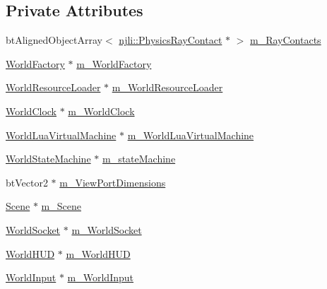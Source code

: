 \subsection*{Private Attributes}
\begin{DoxyCompactItemize}
\item 
bt\+Aligned\+Object\+Array$<$ \mbox{\hyperlink{classnjli_1_1_physics_ray_contact}{njli\+::\+Physics\+Ray\+Contact}} $\ast$ $>$ \mbox{\hyperlink{classnjli_1_1_world_a96897049ea6e799e334d53f8e8735e35}{m\+\_\+\+Ray\+Contacts}}
\item 
\mbox{\hyperlink{classnjli_1_1_world_factory}{World\+Factory}} $\ast$ \mbox{\hyperlink{classnjli_1_1_world_ae50678873f637941aa87ec45c33e9a1c}{m\+\_\+\+World\+Factory}}
\item 
\mbox{\hyperlink{classnjli_1_1_world_resource_loader}{World\+Resource\+Loader}} $\ast$ \mbox{\hyperlink{classnjli_1_1_world_a4ebb658eba80c17e930b96881d3a4e19}{m\+\_\+\+World\+Resource\+Loader}}
\item 
\mbox{\hyperlink{classnjli_1_1_world_clock}{World\+Clock}} $\ast$ \mbox{\hyperlink{classnjli_1_1_world_aacebc8d861e42a409cf1a875972da641}{m\+\_\+\+World\+Clock}}
\item 
\mbox{\hyperlink{classnjli_1_1_world_lua_virtual_machine}{World\+Lua\+Virtual\+Machine}} $\ast$ \mbox{\hyperlink{classnjli_1_1_world_ab3878c3df6c61327dfd7a08864e567a9}{m\+\_\+\+World\+Lua\+Virtual\+Machine}}
\item 
\mbox{\hyperlink{classnjli_1_1_world_state_machine}{World\+State\+Machine}} $\ast$ \mbox{\hyperlink{classnjli_1_1_world_a14412bd1ed14fca506732c0234db2b28}{m\+\_\+state\+Machine}}
\item 
bt\+Vector2 $\ast$ \mbox{\hyperlink{classnjli_1_1_world_a0ac18bfa72f55b16c00703e1035a0af7}{m\+\_\+\+View\+Port\+Dimensions}}
\item 
\mbox{\hyperlink{classnjli_1_1_scene}{Scene}} $\ast$ \mbox{\hyperlink{classnjli_1_1_world_a9c9279cbbb77ef973cb7d003198789b7}{m\+\_\+\+Scene}}
\item 
\mbox{\hyperlink{classnjli_1_1_world_socket}{World\+Socket}} $\ast$ \mbox{\hyperlink{classnjli_1_1_world_a0f6ea126555fa904aa246baba084c9de}{m\+\_\+\+World\+Socket}}
\item 
\mbox{\hyperlink{classnjli_1_1_world_h_u_d}{World\+H\+UD}} $\ast$ \mbox{\hyperlink{classnjli_1_1_world_a922a3ec1f96ac87f97faee6329f39686}{m\+\_\+\+World\+H\+UD}}
\item 
\mbox{\hyperlink{classnjli_1_1_world_input}{World\+Input}} $\ast$ \mbox{\hyperlink{classnjli_1_1_world_a87601ddb30dead7b8b0bd05bcc1f7ff3}{m\+\_\+\+World\+Input}}

\end{DoxyCompactItemize}
